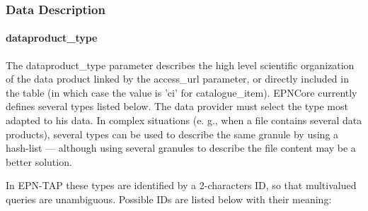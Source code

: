 \documentclass[11pt,a4paper]{ivoa}
\begin{document}
\subsubsection{Data Description}

\paragraph{dataproduct\_type}

The dataproduct\_type parameter describes the high level scientific organization of the data product linked by the access\_url parameter, or directly included in the table (in which case the value is 'ci' for catalogue\_item). EPNCore currently defines several types listed below. The data provider must select the type most adapted to his data. In complex situations (e. g., when a file contains several data products), several types can be used to describe the same granule by using a hash-list — although using several granules to describe the file content may be a better solution.  

In EPN-TAP these types are identified by a 2-characters ID, so that multivalued queries are unambiguous. Possible IDs are listed below with their meaning:
\end{document}
